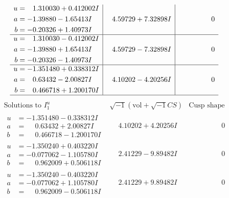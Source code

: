 \documentclass[1p]{elsarticle_modified}
\theoremstyle{definition}
\newcommand{\I}{\sqrt{-1}}
\begin{document}
$$\begin{array}{c|c|c}
\begin{aligned}
u &= \phantom{-}1.310030 + 0.412002 I \\
a &= -1.39880 - 1.65413 I \\
b &= -0.20326 + 1.40973 I\end{aligned}
 & \phantom{-}4.59729 + 7.32898 I & \phantom{-0.000000 } 0 \\ \hline\begin{aligned}
u &= \phantom{-}1.310030 - 0.412002 I \\
a &= -1.39880 + 1.65413 I \\
b &= -0.20326 - 1.40973 I\end{aligned}
 & \phantom{-}4.59729 - 7.32898 I & \phantom{-0.000000 } 0 \\ \hline\begin{aligned}
u &= -1.351480 + 0.338312 I \\
a &= \phantom{-}0.63432 - 2.00827 I \\
b &= \phantom{-}0.466718 + 1.200170 I\end{aligned}
 & \phantom{-}4.10202 - 4.20256 I & \phantom{-0.000000 } 0\\
 \hline 
 \end{array}$$\newpage$$\begin{array}{c|c|c}  
\text{Solutions to }I^u_{1}& \I (\text{vol} + \sqrt{-1}CS) & \text{Cusp shape}\\
 \hline 
\begin{aligned}
u &= -1.351480 - 0.338312 I \\
a &= \phantom{-}0.63432 + 2.00827 I \\
b &= \phantom{-}0.466718 - 1.200170 I\end{aligned}
 & \phantom{-}4.10202 + 4.20256 I & \phantom{-0.000000 } 0 \\ \hline\begin{aligned}
u &= -1.350240 + 0.403220 I \\
a &= -0.077062 - 1.105780 I \\
b &= \phantom{-}0.962009 + 0.506118 I\end{aligned}
 & \phantom{-}2.41229 - 9.89482 I & \phantom{-0.000000 } 0 \\ \hline\begin{aligned}
u &= -1.350240 - 0.403220 I \\
a &= -0.077062 + 1.105780 I \\
b &= \phantom{-}0.962009 - 0.506118 I\end{aligned}
 & \phantom{-}2.41229 + 9.89482 I & \phantom{-0.000000 } 0 \\ \hline\begin{aligned}

\end{aligned}
\end{array}$$
\end{document}

